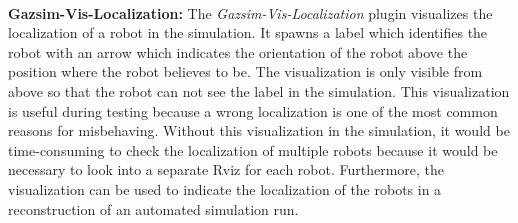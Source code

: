\\
\textbf{Gazsim-Vis-Localization:}
The \textit{Gazsim-Vis-Localization} plugin visualizes the localization of a robot in the simulation. It spawns a label which identifies the robot with an arrow which indicates the orientation of the robot above the position where the robot believes to be. The visualization is only visible from above so that the robot can not see the label in the simulation. This visualization is useful during testing because a wrong localization is one of the most common reasons for misbehaving. Without this visualization in the simulation, it would be time-consuming to check the localization of multiple robots because it would be necessary to look into a separate Rviz for each robot. Furthermore, the visualization can be used to indicate the localization of the robots in a reconstruction of an automated simulation run.
\\


